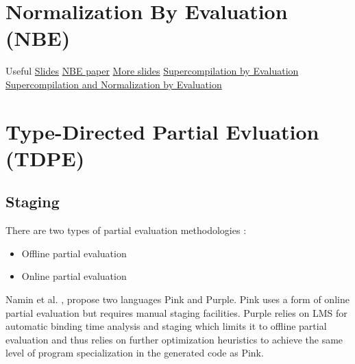 \documentclass{article}
\theoremstyle{definition}
\begin{document}
\section{Normalization By Evaluation (NBE)}
Useful \href{http://cs.ioc.ee/ewscs/2009/dybjer/mainPalmse-revised.pdf}{Slides}
\href{http://www.cse.chalmers.se/~abela/univnbe.pdf}{NBE paper}
\href{http://homepages.inf.ed.ac.uk/slindley/nbe/nbe-cambridge2016.pdf}{More slides}
\href{https://www.microsoft.com/en-us/research/wp-content/uploads/2016/07/supercomp-by-eval.pdf?from=http%3A%2F%2Fresearch.microsoft.com%2Fen-us%2Fum%2Fpeople%2Fsimonpj%2Fpapers%2Fsupercompilation%2Fsupercomp-by-eval.pdf}{Supercompilation by Evaluation}
\href{http://citeseerx.ist.psu.edu/viewdoc/download?doi=10.1.1.630.2123&rep=rep1&type=pdf}{Supercompilation and Normalization by Evaluation}

\section{Type-Directed Partial Evluation (TDPE)}
\cite{grobauer2001second}

\subsection{Staging}
There are two types of partial evaluation methodologies \cite{jones1993partial}:
\begin{itemize}
	\item Offline partial evaluation
	\item Online partial evaluation \cite{cook2011tutorial}
\end{itemize}
Namin et al. \cite{amin2017collapsing}, propose two languages Pink and Purple. Pink uses a form of online partial evaluation but requires manual staging facilities. Purple relies on LMS for automatic binding time analysis and staging
which limits it to offline partial evaluation and thus relies on further optimization heuristics to achieve the same level of program specialization in the generated code as Pink.
\end{document}

